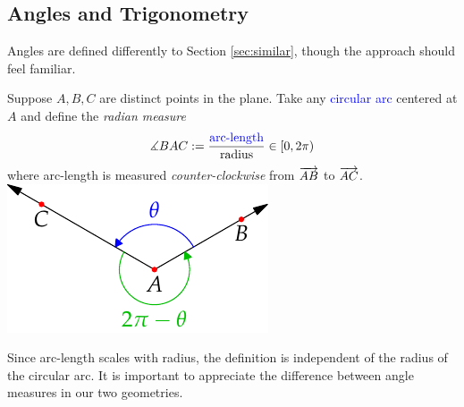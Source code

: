\clearpage


\subsection{Angles and Trigonometry}\label{sec:analyticangle}

Angles are defined differently to Section \ref{sec:similar}, though the approach should feel familiar. %

\begin{defn}[lower separated=false, sidebyside, sidebyside align=top seam, sidebyside gap=0pt, righthand width=0.32\linewidth]{}{}
	Suppose $A,B,C$ are distinct points in the plane. Take any \textcolor{blue}{circular arc} centered at $A$ and define the \emph{radian measure}
	\[
		\measuredangle BAC:=\frac{\text{\textcolor{blue}{arc-length}}}{\text{radius}} \in[0,2\pi)
	\]
	where arc-length is measured \emph{counter-clockwise} from $\overrightarrow{AB}$ to $\overrightarrow{AC}$.
	\tcblower
	\flushright
	\includegraphics{angles-example}
\end{defn}

Since arc-length scales with radius, the definition is independent of the radius of the circular arc. It is important to appreciate the difference between angle measures in our two geometries.\vspace{-5pt}

